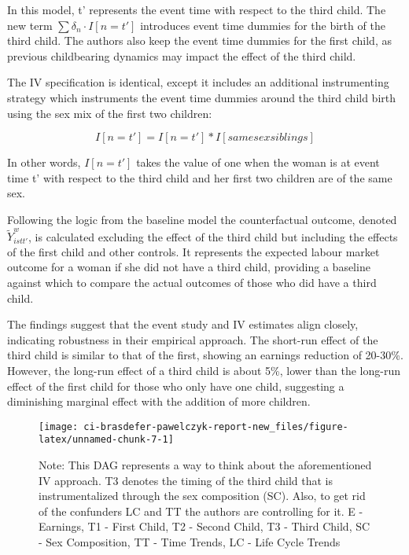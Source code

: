 \documentclass[
]{article}
\begin{document}
In this model, t' represents the event time with respect to the third
child. The new term \(∑ δ_n · I[n = t']\) introduces event time dummies
for the birth of the third child. The authors also keep the event time
dummies for the first child, as previous childbearing dynamics may
impact the effect of the third child.

The IV specification is identical, except it includes an additional
instrumenting strategy which instruments the event time dummies around
the third child birth using the sex mix of the first two children:

\[I[n = t'] = I[n = t'] * I[same sex siblings]\]

In other words, \(I[n = t']\) takes the value of one when the woman is
at event time t' with respect to the third child and her first two
children are of the same sex.

Following the logic from the baseline model the counterfactual outcome,
denoted \(\tilde{Y}^w_{istt'}\), is calculated excluding the effect of
the third child but including the effects of the first child and other
controls. It represents the expected labour market outcome for a woman
if she did not have a third child, providing a baseline against which to
compare the actual outcomes of those who did have a third child.

The findings suggest that the event study and IV estimates align
closely, indicating robustness in their empirical approach. The
short-run effect of the third child is similar to that of the first,
showing an earnings reduction of 20-30\%. However, the long-run effect
of a third child is about 5\%, lower than the long-run effect of the
first child for those who only have one child, suggesting a diminishing
marginal effect with the addition of more children.

\begin{figure}

{\centering \texttt{[image: ci-brasdefer-pawelczyk-report-new\_files/figure-latex/unnamed-chunk-7-1]} 

}

\caption{Note: This DAG represents a way to think about the aforementioned IV approach. T3 denotes the timing of the third child that is instrumentalized through the sex composition (SC). Also, to get rid of the confunders LC and TT the authors are controlling for it. E - Earnings, T1 - First Child, T2 - Second Child, T3 - Third Child, SC - Sex Composition, TT - Time Trends, LC - Life Cycle Trends}\label{fig:unnamed-chunk-7}
\end{figure}
\end{document}
